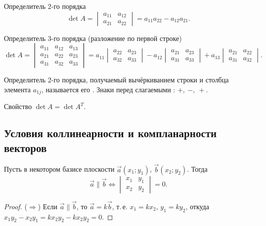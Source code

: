 \documentclass[11pt,a4paper]{article}
\begin{document}
\begin{fbx}{Определитель 2-го порядка}
\[
\det A=\begin{vmatrix}a_{11}&a_{12}\\a_{21}&a_{22}\end{vmatrix}=a_{11}a_{22}-a_{12}a_{21}.
\]
\end{fbx}

\begin{fbx}{Определитель 3-го порядка (разложение по первой строке)}
\[
\det A=\begin{vmatrix}a_{11}&a_{12}&a_{13}\\a_{21}&a_{22}&a_{23}\\a_{31}&a_{32}&a_{33}\end{vmatrix}
=a_{11}\begin{vmatrix}a_{22}&a_{23}\\a_{32}&a_{33}\end{vmatrix}
-a_{12}\begin{vmatrix}a_{21}&a_{23}\\a_{31}&a_{33}\end{vmatrix}
+a_{13}\begin{vmatrix}a_{21}&a_{22}\\a_{31}&a_{32}\end{vmatrix}.
\]
\end{fbx}

Определитель 2-го порядка, получаемый вычёркиванием строки и столбца элемента $a_{1j}$, называется его .
Знаки перед слагаемыми : $+,\ -,\ +$.

\begin{kvb}{Свойство}
$\det A=\det A^T$.
\end{kvb}

\subsection{Условия коллинеарности и компланарности векторов}

\begin{teo}[коллинеарность]
Пусть в некотором базисе плоскости $\vec a(x_1;y_1)$, $\vec b(x_2;y_2)$. Тогда
\[
\vec a\parallel\vec b\iff\begin{vmatrix}x_1&y_1\\x_2&y_2\end{vmatrix}=0.
\]
\end{teo}

\begin{proof}
($\Rightarrow$) Если $\vec a\parallel\vec b$, то $\vec a=k\vec b$, т.\,е. $x_1=kx_2$, $y_1=ky_2$, откуда
$x_1y_2-x_2y_1=kx_2y_2-kx_2y_2=0$.
\end{proof}
\end{document}
